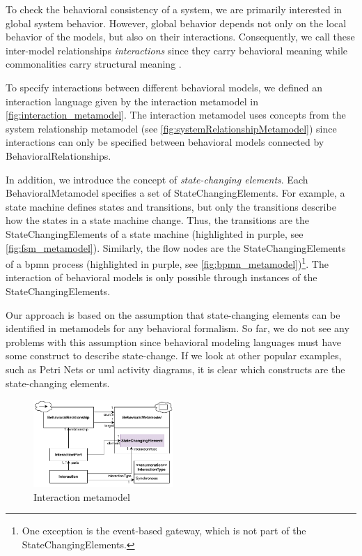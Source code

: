 \documentclass{jot}
\begin{document}
To check the behavioral consistency of a system, we are primarily interested in global system behavior.
However, global behavior depends not only on the local behavior of the models, but also on their interactions.
Consequently, we call these inter-model relationships \emph{interactions} since they carry behavioral meaning while commonalities carry structural meaning \cite{krauterBehavioralConsistencyHeterogeneous2021}.

To specify interactions between different behavioral models, we defined an interaction language given by the interaction metamodel in \autoref{fig:interaction_metamodel}.
The interaction metamodel uses concepts from the system relationship metamodel (see \autoref{fig:systemRelationshipMetamodel}) since interactions can only be specified between behavioral models connected by \textsf{BehavioralRelationship}s.

In addition, we introduce the concept of \emph{state-changing elements}.
Each \textsf{BehavioralMetamodel} specifies a set of \textsf{StateChangingElement}s.
For example, a state machine defines states and transitions, but only the transitions describe how the states in a state machine change.
Thus, the transitions are the \textsf{StateChangingElement}s of a state machine (highlighted in purple, see \autoref{fig:fsm_metamodel}).
Similarly, the flow nodes are the \textsf{StateChangingElement}s of a \gls*{bpmn} process (highlighted in purple, see \autoref{fig:bpmn_metamodel})\footnote{One exception is the event-based gateway, which is not part of the \textsf{StateChangingElement}s.}.
The interaction of behavioral models is only possible through instances of the \textsf{StateChangingElement}s.

Our approach is based on the assumption that state-changing elements can be identified in metamodels for any behavioral formalism.
So far, we do not see any problems with this assumption since behavioral modeling languages must have some construct to describe state-change.
If we look at other popular examples, such as Petri Nets or \gls*{uml} activity diagrams, it is clear which constructs are the state-changing elements. 

\begin{figure}[h]
    \centering
    \includegraphics[width=0.475\textwidth]{figures/interaction_metamodel.pdf}
    \caption{Interaction metamodel}
    \label{fig:interaction_metamodel}
\end{figure}
\end{document}
